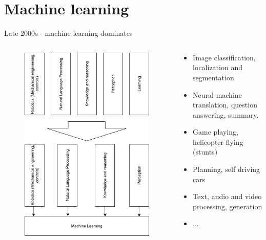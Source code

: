 \section{Machine learning}
\begin{frame}{Late 2000s - machine learning dominates}
	\begin{columns}
		\begin{column}{.5\textwidth}
			\begin{figure}
				\includegraphics[width=.75\textwidth, center]{figures/agent_components_2}
			\end{figure}
		\end{column}
		\begin{column}{.5\textwidth}
			{\small 
				\begin{itemize}
					\item Image classification, localization and segmentation 
					\item Neural machine translation, question answering, summary. 
					\item Game playing, helicopter flying (stunts)
					\item Planning, self driving cars 
					\item Text, audio and video processing, generation 
					\item $\dots $
				\end{itemize}
			}
		\end{column}
	\end{columns}
\end{frame}
